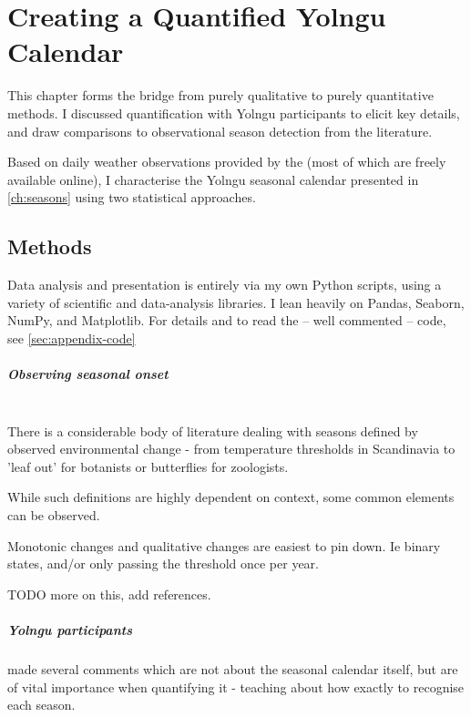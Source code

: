\chapter{Creating a Quantified Yolngu Calendar}
\label{ch:quantify}

This chapter forms the bridge from purely qualitative to purely quantitative
methods.  I discussed quantification with Yolngu participants to elicit
key details, and draw comparisons to observational season detection from
the literature.

Based on daily weather observations provided by the \citet{BOM-data}
(most of which are freely available online), I characterise
the Yolngu seasonal calendar presented in \autoref{ch:seasons}
using two statistical approaches.


\section{Methods}

Data analysis and presentation is entirely via my own Python scripts,
using a variety of scientific and data-analysis libraries.
I lean heavily on Pandas, Seaborn, NumPy, and Matplotlib.
For details and to read the -- well commented -- code, see
\autoref{sec:appendix-code}


\paragraph{Observing seasonal onset}~\\
There is a considerable body of literature dealing with seasons defined
by observed environmental change - from temperature thresholds in
Scandinavia to 'leaf out' for botanists or butterflies for zoologists.

While such definitions are highly dependent on context, some common
elements can be observed.  

Monotonic changes and qualitative changes are easiest to pin down.
Ie binary states, and/or only passing the threshold once per year.

TODO more on this, add references.


\paragraph{Yolngu participants} made several comments which are not about
the seasonal calendar itself, but are of vital importance when quantifying
it - teaching about how exactly to recognise each season.

